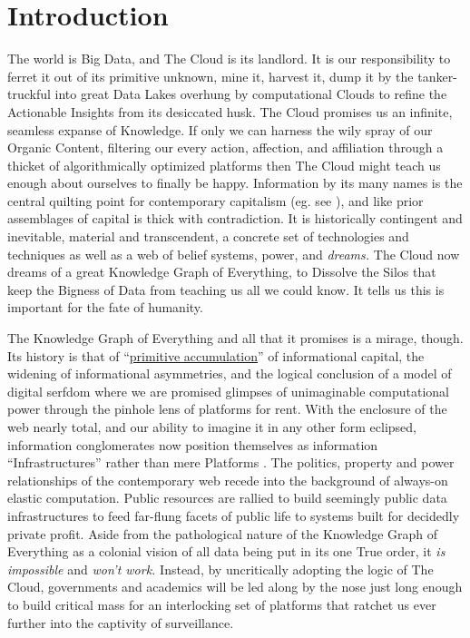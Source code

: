 
\hypertarget{introduction}{%
\section{Introduction}\label{introduction}}

The world is Big Data, and The Cloud is its landlord. It is our
responsibility to ferret it out of its primitive unknown, mine it,
harvest it, dump it by the tanker-truckful into great Data Lakes
overhung by computational Clouds to refine the Actionable Insights from
its desiccated husk. The Cloud promises us an infinite, seamless expanse
of Knowledge. If only we can harness the wily spray of our Organic
Content, filtering our every action, affection, and affiliation through
a thicket of algorithmically optimized platforms then The Cloud might
teach us enough about ourselves to finally be happy. Information by its
many names is the central quilting point for contemporary capitalism
(eg. see \cite{warkCapitalDeadThis2021} ), and like prior
assemblages of capital is thick with contradiction. It is historically
contingent and inevitable, material and transcendent, a concrete set of
technologies and techniques as well as a web of belief systems, power,
and \emph{dreams.} The Cloud now dreams of a great Knowledge Graph of
Everything, to Dissolve the Silos that keep the Bigness of Data from
teaching us all we could know. It tells us this is important for the
fate of humanity.

The Knowledge Graph of Everything and all that it promises is a mirage,
though. Its history is that of
``\href{https://en.wikipedia.org/wiki/Primitive_accumulation_of_capital}{primitive
accumulation}'' of informational capital, the widening of informational
asymmetries, and the logical conclusion of a model of digital serfdom
where we are promised glimpses of unimaginable computational power
through the pinhole lens of platforms for rent. With the enclosure of
the web nearly total, and our ability to imagine it in any other form
eclipsed, information conglomerates now position themselves as
information ``Infrastructures'' rather than mere Platforms \cite{barnsWhenWebBecame2020, plantinInfrastructureStudiesMeet2018} . The
politics, property and power relationships of the contemporary web
recede into the background of always-on elastic computation. Public
resources are rallied to build seemingly public data infrastructures to
feed far-flung facets of public life to systems built for decidedly
private profit. Aside from the pathological nature of the Knowledge
Graph of Everything as a colonial vision of all data being put in its
one True order, it \emph{is impossible} and \emph{won't work.} Instead,
by uncritically adopting the logic of The Cloud, governments and
academics will be led along by the nose just long enough to build
critical mass for an interlocking set of platforms that ratchet us ever
further into the captivity of surveillance.


